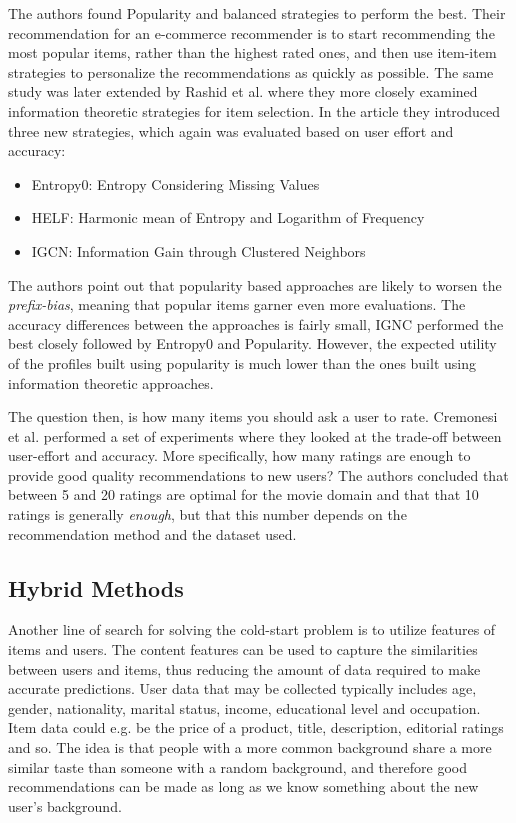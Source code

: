 The authors found Popularity and balanced strategies to perform the best. Their
recommendation for an e-commerce recommender is to start recommending the most
popular items, rather than the highest rated ones, and then use item-item
strategies to personalize the recommendations as quickly as possible. The same
study was later extended by Rashid et al. \cite{Rashid2008} where they more
closely examined information theoretic strategies for item selection. In the
article they introduced three new strategies, which again was evaluated based
on user effort and accuracy:

\begin{itemize}
\item Entropy0: Entropy Considering Missing Values
\item HELF: Harmonic mean of Entropy and Logarithm of Frequency
\item IGCN: Information Gain through Clustered Neighbors
\end{itemize}

The authors point out that popularity based approaches are likely to worsen the
\emph{prefix-bias}, meaning that popular items garner even more evaluations.
The accuracy differences between the approaches is fairly small, IGNC performed
the best closely followed by Entropy0 and Popularity. However, the expected
utility of the profiles built using popularity is much lower than the ones built
using information theoretic approaches.\newline

The question then, is how many items you should ask a user to rate. Cremonesi
et al. \cite{Cremonesi2012} performed a set of experiments where they looked
at the trade-off between user-effort and accuracy. More specifically, how many
ratings are enough to provide good quality recommendations to new users? The
authors concluded that between 5 and 20 ratings are optimal for the movie
domain and that that 10 ratings is generally \emph{enough}, but that this number
depends on the recommendation method and the dataset used.

\subsection{Hybrid Methods}

Another line of search for solving the cold-start problem is to utilize
features of items and users. The content features can be used to capture the
similarities between users and items, thus reducing the amount of data required
to make accurate predictions. User data that may be collected typically
includes age, gender, nationality, marital status, income, educational level
and occupation. Item data could e.g. be the price of a product, title,
description, editorial ratings and so. The idea is that people with a more
common background share a more similar taste than someone with a random
background, and therefore good recommendations can be made as long as we know
something about the new user's background.

